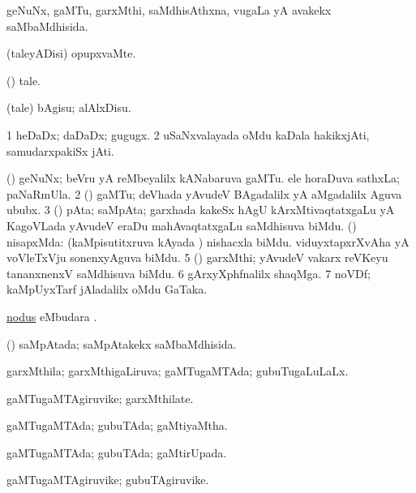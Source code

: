 \bentry
{}
\gl{\gu}
\bmng
geNuNx, gaMTu, garxMthi, saMdhisAthxna, \mo vugaLa yA avakekx saMbaMdhisida. 
\emng
\eentry

\bentry
{}
\gl{\kirxvi}
\bmng
(taleyADisi) opupxvaMte. 
\emng
\eentry

\bentry
{}
\gl{\nA}
\bmng
(\AmA) tale. 
\emng
\eentry

\bentry
{}
\gl{\sakirx}
\bmng
(tale) bAgisu; alAlxDisu. 
\emng
\eentry

\bentry
{}
\gl{\nA}
\bmng
\bnum
\num{1} heDaDx; daDaDx; gugugx. 
\num{2} uSaNxvalayada oMdu kaDala hakikxjAti, samudarxpakiSx jAti. 
\enum
\emng
\eentry

\bentry
{}
\gl{\nA}
\bmng
\bnum
{} (\savi) 
\banum
{} geNuNx; beVru yA reMbeyalilx kANabaruva gaMTu. 
 ele horaDuva sathxLa; paNaRmUla. 
\eanum
\numie
\num{2} (\aMrashA) gaMTu; deVhada yAvudeV BAgadalilx yA aMgadalilx Aguva ububx. 
\num{3} (\Kavi) pAta; saMpAta; garxhada kakeSx hAgU kArxMtivaqtatxgaLu yA KagoVLada yAvudeV eraDu mahAvaqtatxgaLu saMdhisuva biMdu. 
 (\Bwvi) nisapxMda: 
\banum
{} (kaMpisutitxruva kAyada \vi) nishacxla biMdu. 
 viduyxtapxrXvAha yA voVleTxVju sonenxyAguva biMdu. 
\eanum
\numie
\num{5} (\ga) garxMthi; yAvudeV vakarx reVKeyu tananxnenxV saMdhisuva biMdu. 
\num{6} gArxyXphfnalilx shaqMga. 
\num{7} noVDf; kaMpUyxTarf jAladalilx oMdu GaTaka. 
\enum
\emng
\eentry

\bentry
{}
\gl{\nA}
\bmng
\hyperlink{nodus}{nodus} eMbudara \bava. 
\emng
\eentry

\bentry
{}
\gl{\gu}
\bmng
(\Kavi) saMpAtada; saMpAtakekx saMbaMdhisida. 
\emng
\eentry

\bentry
{}
\gl{\gu}
\bmng
garxMthila; garxMthigaLiruva; gaMTugaMTAda; gubuTugaLuLaLx. 
\emng
\eentry

\bentry
{}
\gl{\nA}
\bmng
gaMTugaMTAgiruvike; garxMthilate. 
\emng
\eentry

\bentry
{}
\gl{\gu}
\bmng
gaMTugaMTAda; gubuTAda; gaMtiyaMtha. 
\emng
\eentry

\bentry
{}
\gl{\gu}
\bmng
gaMTugaMTAda; gubuTAda; gaMtirUpada. 
\emng
\eentry

\bentry
{}
\gl{\nA}
\bmng
gaMTugaMTAgiruvike; gubuTAgiruvike. 
\emng
\eentry

